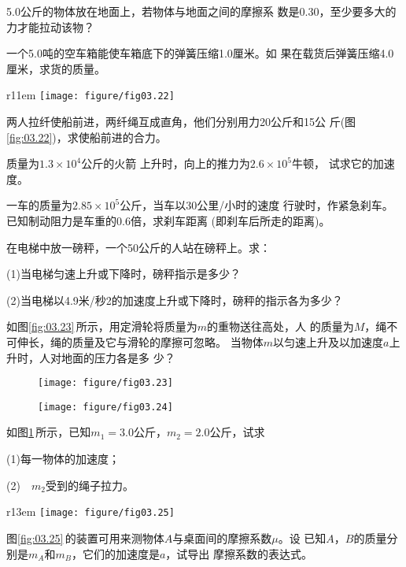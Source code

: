 \documentclass[../outline-of-mechanics.tex]{subfiles}
\begin{document}
\begin{exercises}

\exercise 5.0公斤的物体放在地面上，若物体与地面之间的摩擦系
数是0.30，至少要多大的力才能拉动该物？

\exercise 一个5.0吨的空车箱能使车箱底下的弹簧压缩1.0厘米。如
果在载货后弹簧压缩4.0厘米，求货的质量。

\begin{wrapfigure}[6]{r}{11em}
  \centering
  \texttt{[image: figure/fig03.22]}
  \caption{}
  \label{fig:03.22}
\end{wrapfigure}
\exercise 两人拉纤使船前进，两纤绳互成直角，他们分别用力20公斤和15公
斤(图\ref{fig:03.22})，求使船前进的合力。

\exercise 质量为$ 1.3 \times 10^4 $公斤的火箭
上升时，向上的推力为$ 2.6 \times 10 ^ { 5 } $牛顿，
试求它的加速度。

\exercise 一车的质量为$ 2.85 \times 10 ^ { 5 } $公斤，当车以30公里/小时的速度
行驶时，作紧急刹车。已知制动阻力是车重的0.6倍，求刹车距离
(即刹车后所走的距离)。

\exercise 在电梯中放一磅秤，一个50公斤的人站在磅秤上。求：

(1)当电梯匀速上升或下降时，磅秤指示是多少？

(2)当电梯以4.9米/秒2的加速度上升或下降时，磅秤的指示各为多少？

\exercise 如图\ref{fig:03.23}\,所示，用定滑轮将质量为$ m $的重物送往高处，人
的质量为$ M $，绳不可伸长，绳的质量及它与滑轮的摩擦可忽略。
当物体$ m $以匀速上升及以加速度$ a $上升时，人对地面的压力各是多
少？

\begin{figure}[h]
  \begin{minipage}[b]{0.4\linewidth}
    \centering
    \texttt{[image: figure/fig03.23]}
    \caption{}
    \label{fig:03.23}
  \end{minipage}
  \begin{minipage}[b]{0.6\linewidth}
    \centering
    \texttt{[image: figure/fig03.24]}
    \caption{}
    \label{fig:03.24}
  \end{minipage}
  \vspace{-1.56em}
\end{figure}
\exercise 如图\ref{fig:03.24}\,所示，已知$ m _ { 1 } = 3 . 0 $公斤，$ m _ { 2 } = 2 . 0 $公斤，试求

(1)每一物体的加速度；

(2)~~$ m _ { 2 } $受到的绳子拉力。

\begin{wrapfigure}[8]{r}{13em}
  \centering
  \texttt{[image: figure/fig03.25]}
  \caption{}
  \label{fig:03.25}
\end{wrapfigure}
\exercise 图\ref{fig:03.25}\,的装置可用来测物体$ A $与桌面间的摩擦系数$ \mu $。设
已知$ A $，$ B $的质量分别是$ m_A $和$ m_B $，它们的加速度是$ a $，试导出
摩擦系数的表达式。


\end{exercises}
\end{document}
